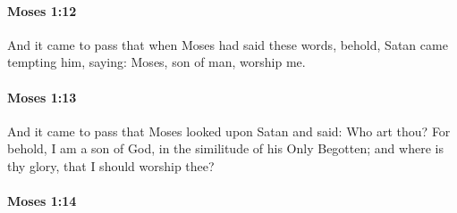 
		\paragraph{Moses 1:12} %
			\label{MOSES-1-12}

			And it came to pass that when Moses had said these words, behold, Satan came tempting him, saying: Moses, son of man, worship me.


		\paragraph{Moses 1:13} %
			\label{MOSES-1-13}

			And it came to pass that Moses looked upon Satan and said: Who art thou? For behold, I am a son of God, in the similitude of his Only Begotten; and where is thy glory, that I should worship thee?


		\paragraph{Moses 1:14} %
			\label{MOSES-1-14}

